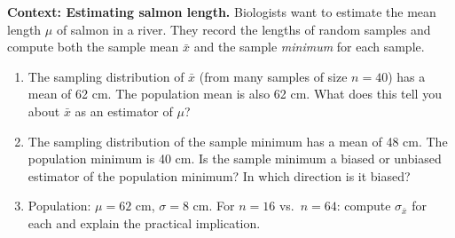 \documentclass[10pt]{article}
\begin{document}
\vspace{0.12in}

\begin{tcolorbox}[colback=redbg, colframe=black!40, boxrule=0.6pt, arc=2mm,
    left=3mm, right=3mm, top=2mm, bottom=2mm, title=\textbf{Tier A --- Approaching Proficiency}]
\textbf{Context: Estimating salmon length.}
Biologists want to estimate the mean length $\mu$ of salmon in a river. They record the
lengths of random samples and compute both the sample mean $\bar{x}$ and the sample
\emph{minimum} for each sample.

\begin{enumerate}
  \item The sampling distribution of $\bar{x}$ (from many samples of size $n = 40$) has a
        mean of 62 cm. The population mean is also 62 cm. What does this tell you about
        $\bar{x}$ as an estimator of $\mu$?
        \\
  \item The sampling distribution of the sample minimum has a mean of 48 cm. The population
        minimum is 40 cm. Is the sample minimum a biased or unbiased estimator of the
        population minimum? In which direction is it biased?
        \\
  \item Population: $\mu = 62$ cm, $\sigma = 8$ cm. For $n = 16$ vs.\ $n = 64$:
        compute $\sigma_{\bar{x}}$ for each and explain the practical implication.
        \par\vspace{-\parskip}\nointerlineskip\noindent\begin{minipage}[t][0.8in][t]{\linewidth}\vspace*{2pt}\\
        \\
        \end{minipage}
\end{enumerate}
\end{tcolorbox}

\vspace{0.12in}
\end{document}
